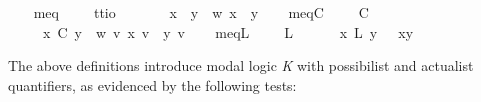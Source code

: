 \begin{isabellebody}
\isamarkuptrue%
\ \ \isamarkupfalse%
\ meq\ \ \ \ {\isacharcolon}{\isacharcolon}\ {\isachardoublequoteopen}{\isacharprime}t{\isasymRightarrow}{\isacharprime}t{\isasymRightarrow}io{\isachardoublequoteclose}\ {\isacharparenleft}\ %
\isanewline
\ \ \ \ \ {\isachardoublequoteopen}x\ \isactrlbold {\isasymapprox}\ y\ {\isasymequiv}\ {\isasymlambda}w{\isachardot}\ x\ {\isacharequal}\ y{\isachardoublequoteclose}\isanewline
\ \ \isamarkupfalse%
\ meqC\ \ \ {\isacharcolon}{\isacharcolon}\ {\isachardoublequoteopen}{\isasymup}{\isasymlangle}{\isasymup}{\isasymzero}{\isacharcomma}{\isasymup}{\isasymzero}{\isasymrangle}{\isachardoublequoteclose}\ {\isacharparenleft}\isactrlbold {\isasymapprox}\isactrlsup C{\isachardoublequoteclose}{}{}{\isacharparenright}\ %
\isanewline
\ \ \ \ \ {\isachardoublequoteopen}x\ \isactrlbold {\isasymapprox}\isactrlsup C\ y\ {\isasymequiv}\ {\isasymlambda}w{\isachardot}\ {\isasymforall}v{\isachardot}\ {\isacharparenleft}x\ v{\isacharparenright}\ {\isacharequal}\ {\isacharparenleft}y\ v{\isacharparenright}{\isachardoublequoteclose}\isanewline
\ \ \isamarkupfalse%
\ meqL\ \ \ {\isacharcolon}{\isacharcolon}\ {\isachardoublequoteopen}{\isasymup}{\isasymlangle}{\isasymzero}{\isacharcomma}{\isasymzero}{\isasymrangle}{\isachardoublequoteclose}\ {\isacharparenleft}\isactrlbold {\isasymapprox}\isactrlsup L{\isachardoublequoteclose}{}{}{\isacharparenright}\ %
\isanewline
\ \ \ \ \ {\isachardoublequoteopen}x\ \isactrlbold {\isasymapprox}\isactrlsup L\ y\ {\isasymequiv}\ \isactrlbold {\isasymforall}{\isasymphi}{\isachardot}\ {\isasymphi}{\isacharparenleft}x{\isacharparenright}\isactrlbold {\isasymrightarrow}{\isasymphi}{\isacharparenleft}y{\isacharparenright}{\isachardoublequoteclose}%
\isamarkuptrue%
%
\begin{isamarkuptext}%
The above definitions introduce modal logic \emph{K} with possibilist and actualist quantifiers,
as evidenced by the following tests:%
\end{isamarkuptext}\isamarkuptrue%

\end{isabellebody}
